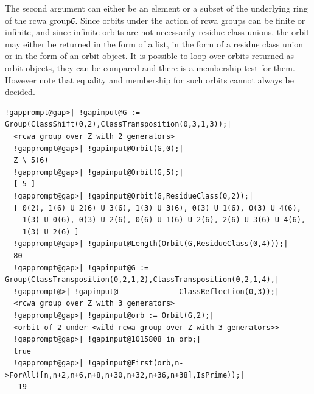 \documentclass[a4paper,11pt]{report}
\begin{document}
{{{ The second argument can either be an element or a subset of the underlying
ring of the rcwa group{\nobreakspace}\mbox{\texttt{\mdseries\slshape G}}. Since orbits under the action of rcwa groups can be finite or infinite, and
since infinite orbits are not necessarily residue class unions, the orbit may
either be returned in the form of a list, in the form of a residue class union
or in the form of an orbit object. It is possible to loop over orbits returned
as orbit objects, they can be compared and there is a membership test for
them. However note that equality and membership for such orbits cannot always
be decided. 
\begin{Verbatim}[commandchars=!@|,fontsize=\small,frame=single,label=Example]
  !gapprompt@gap>| !gapinput@G := Group(ClassShift(0,2),ClassTransposition(0,3,1,3));|
  <rcwa group over Z with 2 generators>
  !gapprompt@gap>| !gapinput@Orbit(G,0);|
  Z \ 5(6)
  !gapprompt@gap>| !gapinput@Orbit(G,5);|
  [ 5 ]
  !gapprompt@gap>| !gapinput@Orbit(G,ResidueClass(0,2));|
  [ 0(2), 1(6) U 2(6) U 3(6), 1(3) U 3(6), 0(3) U 1(6), 0(3) U 4(6), 
    1(3) U 0(6), 0(3) U 2(6), 0(6) U 1(6) U 2(6), 2(6) U 3(6) U 4(6), 
    1(3) U 2(6) ]
  !gapprompt@gap>| !gapinput@Length(Orbit(G,ResidueClass(0,4)));|
  80
  !gapprompt@gap>| !gapinput@G := Group(ClassTransposition(0,2,1,2),ClassTransposition(0,2,1,4),|
  !gapprompt@>| !gapinput@              ClassReflection(0,3));|
  <rcwa group over Z with 3 generators>
  !gapprompt@gap>| !gapinput@orb := Orbit(G,2);|
  <orbit of 2 under <wild rcwa group over Z with 3 generators>>
  !gapprompt@gap>| !gapinput@1015808 in orb;|
  true
  !gapprompt@gap>| !gapinput@First(orb,n->ForAll([n,n+2,n+6,n+8,n+30,n+32,n+36,n+38],IsPrime));|
  -19
\end{Verbatim}
 }

 

}}
\end{document}
